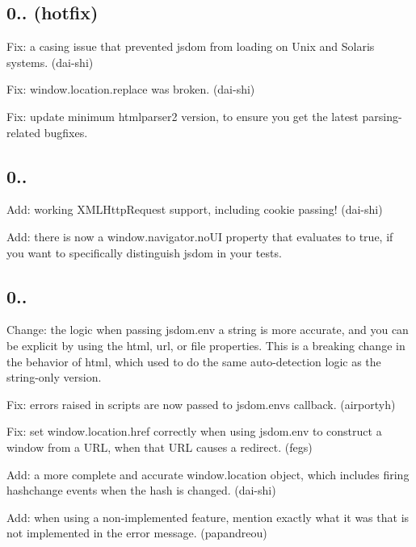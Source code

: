 \subsection*{0.. (hotfix)}


\begin{DoxyItemize}
\item Fix\+: a casing issue that prevented jsdom from loading on Unix and Solaris systems. (dai-\/shi)
\item Fix\+: {\ttfamily window.\+location.\+replace} was broken. (dai-\/shi)
\item Fix\+: update minimum htmlparser2 version, to ensure you get the latest parsing-\/related bugfixes.
\end{DoxyItemize}

\subsection*{0..}


\begin{DoxyItemize}
\item Add\+: working {\ttfamily X\+M\+L\+Http\+Request} support, including cookie passing! (dai-\/shi)
\item Add\+: there is now a {\ttfamily window.\+navigator.\+no\+UI} property that evaluates to true, if you want to specifically distinguish jsdom in your tests.
\end{DoxyItemize}

\subsection*{0..}


\begin{DoxyItemize}
\item Change\+: the logic when passing {\ttfamily jsdom.\+env} a string is more accurate, and you can be explicit by using the {\ttfamily html}, {\ttfamily url}, or {\ttfamily file} properties. This is a breaking change in the behavior of {\ttfamily html}, which used to do the same auto-\/detection logic as the string-\/only version.
\item Fix\+: errors raised in scripts are now passed to {\ttfamily jsdom.\+env}\textquotesingle{}s callback. (airportyh)
\item Fix\+: set {\ttfamily window.\+location.\+href} correctly when using {\ttfamily jsdom.\+env} to construct a window from a U\+RL, when that U\+RL causes a redirect. (fegs)
\item Add\+: a more complete and accurate {\ttfamily window.\+location} object, which includes firing {\ttfamily hashchange} events when the hash is changed. (dai-\/shi)
\item Add\+: when using a non-\/implemented feature, mention exactly what it was that is not implemented in the error message. (papandreou)
\end{DoxyItemize}

